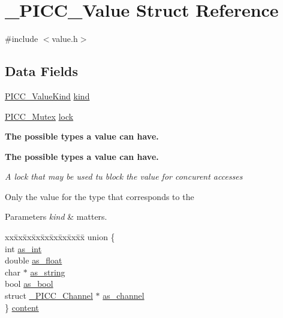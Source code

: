 \hypertarget{struct__PICC__Value}{\section{\-\_\-\-P\-I\-C\-C\-\_\-\-Value Struct Reference}
\label{struct__PICC__Value}
}


{\ttfamily \#include $<$value.\-h$>$}

\subsection*{Data Fields}
{\bf }\par
\begin{DoxyCompactItemize}
\item 
\hyperlink{value_8h_aa36f34a9037f3bd711984b08dfc22c15}{P\-I\-C\-C\-\_\-\-Value\-Kind} \hyperlink{struct__PICC__Value_a3daeb493d6690c977813226ce2f50421}{kind}
\item 
\hyperlink{sync_8h_a600a20a1dd394c06182a81d72e3357f4}{P\-I\-C\-C\-\_\-\-Mutex} \hyperlink{struct__PICC__Value_aa81746d9bb365cc0a8f8229780b70e78}{lock}
\end{DoxyCompactItemize}

\begin{Indent}{\bf The possible types a value can have.}\par
\end{Indent}
\begin{Indent}{\bf The possible types a value can have.}\par
{\em A lock that may be used tu block the value for concurent accesses

Only the value for the type that corresponds to the
\begin{DoxyParams}{Parameters}
{\em kind} & matters. \\
\hline
\end{DoxyParams}
}\begin{DoxyCompactItemize}
\item 
\begin{tabbing}
xx\=xx\=xx\=xx\=xx\=xx\=xx\=xx\=xx\=\kill
union \{\\
\>int \hyperlink{struct__PICC__Value_a9a5694c2d3ca43921fd537cf7f653a82}{as\_int}\\
\>double \hyperlink{struct__PICC__Value_a9ef852abed242872ec66473b1dbf52ce}{as\_float}\\
\>char $\ast$ \hyperlink{struct__PICC__Value_a32aa118c757eaf418d2dbfd2182b3242}{as\_string}\\
\>bool \hyperlink{struct__PICC__Value_a325709a2dce45972f933f358f0546327}{as\_bool}\\
\>struct \hyperlink{struct__PICC__Channel}{\_PICC\_Channel} $\ast$ \hyperlink{struct__PICC__Value_a5b09e392f74cf7a493e0524c904b0ea2}{as\_channel}\\
\} \hyperlink{struct__PICC__Value_ae479e83bf66b91bb89f7b7dd5b19f2b5}{content}\\

\end{tabbing}\end{DoxyCompactItemize}
\end{Indent}


